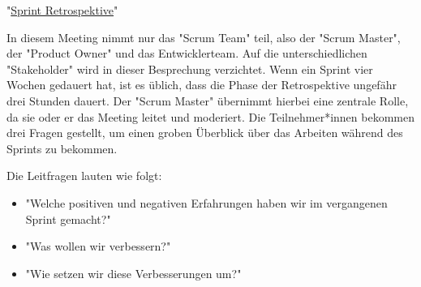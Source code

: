 "\underline{Sprint Retrospektive}"

In diesem Meeting nimmt nur das "Scrum Team" teil, also der "Scrum Master", der "Product Owner" und das Entwicklerteam. Auf die unterschiedlichen "Stakeholder" wird in dieser Besprechung verzichtet. Wenn ein Sprint vier Wochen gedauert hat, ist es üblich, dass die Phase der Retrospektive ungefähr drei Stunden dauert. Der "Scrum Master" übernimmt hierbei eine zentrale Rolle, da sie oder er das Meeting leitet und moderiert. Die Teilnehmer*innen bekommen drei Fragen gestellt, um einen groben Überblick über das Arbeiten während des Sprints zu bekommen. \cite{SprintRetrospektive}

Die Leitfragen lauten wie folgt:

\begin{itemize}
    \item "Welche positiven und negativen Erfahrungen haben wir im vergangenen Sprint gemacht?" \cite{SprintRetrospektive}
    \item "Was wollen wir verbessern?" \cite{SprintRetrospektive}
    \item "Wie setzen wir diese Verbesserungen um?" \cite{SprintRetrospektive}
\end{itemize}
